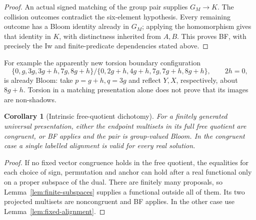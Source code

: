 \documentclass[11pt]{article}
\newtheorem{corollary}[theorem]{Corollary}
\theoremstyle{remark}
\begin{document}
\begin{proof}
An actual signed matching of the group pair supplies $G_M\to K$.
The collision outcomes contradict the six-element hypothesis. Every
remaining outcome has a Bloom identity already in $G_M$; applying the
homomorphism gives that identity in $K$, with distinctness inherited from
$A,B$. This proves BF, with precisely the Iw and finite-predicate
dependencies stated above.
\end{proof}

For example the apparently new torsion boundary configuration
\[
 \{0,g,3g,3g+h,7g,8g+h\}/
 \{0,2g+h,4g+h,7g,7g+h,8g+h\},\qquad 2h=0,
\]
is already Bloom: take $p=g+h,q=3g$ and reflect $Y,X$, respectively,
about $8g+h$. Torsion in a matching presentation alone does not prove
that its images are non-shadows.

\begin{corollary}[Intrinsic free-quotient dichotomy]\label{cor:free-dichotomy}
For a finitely generated universal presentation, either the endpoint
multisets in its full free quotient are congruent, or BF applies and the
pair is group-valued Bloom. In the congruent case a single labelled
alignment is valid for every real solution.
\end{corollary}
\begin{proof}
If no fixed vector congruence holds in the free quotient, the equalities for each choice of
sign, permutation and anchor can hold after a real functional only
on a proper subspace of the dual. There are finitely many proposals, so
Lemma~\ref{lem:finite-subspaces} supplies a functional outside all of
them. Its two projected multisets are noncongruent and BF applies.
In the other case use Lemma~\ref{lem:fixed-alignment}.
\end{proof}
\end{document}
